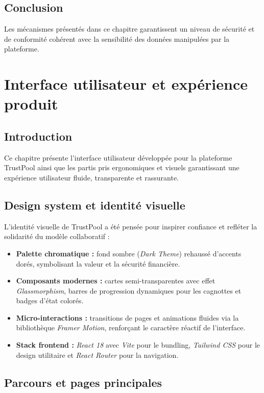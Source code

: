 \documentclass[12pt,a4paper]{report}
\begin{document}
\section{Conclusion}
Les mécanismes présentés dans ce chapitre garantissent un niveau de sécurité et de conformité cohérent avec la sensibilité des données manipulées par la plateforme.

\newpage

\chapter{Interface utilisateur et expérience produit}

\section{Introduction}
Ce chapitre présente l'interface utilisateur développée pour la plateforme TrustPool ainsi que les partis pris ergonomiques et visuels garantissant une expérience utilisateur fluide, transparente et rassurante.

\section{Design system et identité visuelle}
L'identité visuelle de TrustPool a été pensée pour inspirer confiance et refléter la solidarité du modèle collaboratif :
\begin{itemize}
    \item \textbf{Palette chromatique :} fond sombre (\textit{Dark Theme}) rehaussé d'accents dorés, symbolisant la valeur et la sécurité financière.
    \item \textbf{Composants modernes :} cartes semi-transparentes avec effet \textit{Glassmorphism}, barres de progression dynamiques pour les cagnottes et badges d'état colorés.
    \item \textbf{Micro-interactions :} transitions de pages et animations fluides via la bibliothèque \textit{Framer Motion}, renforçant le caractère réactif de l'interface.
    \item \textbf{Stack frontend :} \textit{React 18} avec \textit{Vite} pour le bundling, \textit{Tailwind CSS} pour le design utilitaire et \textit{React Router} pour la navigation.
\end{itemize}

\section{Parcours et pages principales}
\end{document}

